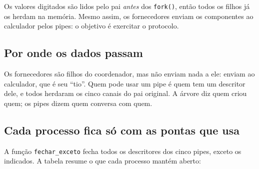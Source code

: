 \documentclass[11pt,a4paper]{article}
\newcommand{\cmd}[1]{\texttt{#1}}
\begin{document}
Os valores digitados são lidos pelo pai \emph{antes} dos \cmd{fork()}, então todos os filhos já os herdam na memória. Mesmo assim, os fornecedores enviam os componentes ao calculador pelos pipes: o objetivo é exercitar o protocolo.

\subsection{Por onde os dados passam}

\begin{center}
\end{center}

\begin{alerta}
Os fornecedores são filhos do coordenador, mas não enviam nada a ele: enviam ao calculador, que é seu ``tio''. Quem pode usar um pipe é quem tem um descritor dele, e todos herdaram os cinco canais do pai original. A árvore diz quem criou quem; os pipes dizem quem conversa com quem.
\end{alerta}

\subsection{Cada processo fica só com as pontas que usa}

A função \cmd{fechar\_exceto} fecha todos os descritores dos cinco pipes, exceto os indicados. A tabela resume o que cada processo mantém aberto:
\end{document}
